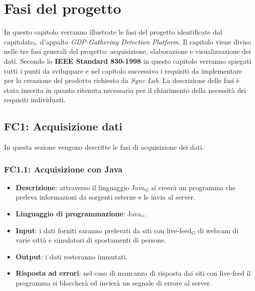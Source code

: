 \chapter{Fasi del progetto}\label{fasiProgetto}
In questo capitolo verranno illustrate le fasi del progetto identificate dal capitolato$_{\scaleto{G}{3pt}}$ d'appalto \textit{GDP-Gathering Detection Platform}. Il capitolo viene diviso nelle tre fasi generali del progetto: acquisizione, elaborazione e visualizzazione dei dati. Secondo lo \textbf{IEEE Standard 830-1998} in questo capitolo verranno spiegati tutti i punti da sviluppare e nel capitolo successivo i requisiti da implementare per la creazione del prodotto richiesto da \textit{Sync Lab}. La descrizione delle fasi è stata inserita in quanto ritenuta necessaria per il chiarimento della necessità dei requisiti individuati. %

\section{FC1: Acquisizione dati}\label{fasiProgettoAquisizioneDati}%
In questa sezione vengono descritte le fasi di acquisizione dei dati.

\subsection{FC1.1: Acquisizione con Java}\label{fasiProgettoAquisizioneDatiJava}

\begin{itemize}
	\item \textbf{Descrizione}: attraverso il linguaggio Java$_G$ si creerà un programma che preleva informazioni da sorgenti esterne e le invia al server.
	\item \textbf{Linguaggio di programmazione}: Java$_{\scaleto{G}{3pt}}$.
	\item \textbf{Input}: i dati forniti saranno prelevati da siti con live-feed$_G$ di webcam di varie città e simulatori di spostamenti di persone.
	\item \textbf{Output}: i dati resteranno immutati.
	\item \textbf{Risposta ad errori}: nel caso di mancanza di risposta dai siti con live-feed il programma si bloccherà ed invierà un segnale di errore al server.
\end{itemize}


